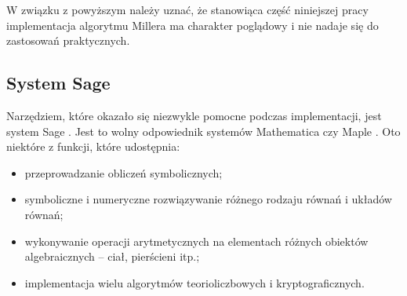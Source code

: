 \noindent
W związku z powyższym należy uznać, że stanowiąca część niniejszej pracy
implementacja algorytmu Millera ma charakter poglądowy
i nie nadaje się do zastosowań praktycznych.

\subsection*{System Sage}

\noindent
Narzędziem, które okazało się niezwykle pomocne podczas implementacji,
jest system Sage \cite{sage}.
Jest to wolny odpowiednik systemów
Mathematica \cite{mathematica} czy Maple \cite{maple}.
Oto niektóre z funkcji, które udostępnia:
\begin{itemize}
\item
przeprowadzanie obliczeń symbolicznych;
\item
symboliczne i numeryczne rozwiązywanie
różnego rodzaju równań i układów równań;
\item
wykonywanie operacji arytmetycznych
na elementach różnych obiektów algebraicznych --
ciał, pierścieni itp.;
\item
implementacja wielu algorytmów teorioliczbowych i kryptograficznych.
\end{itemize}
